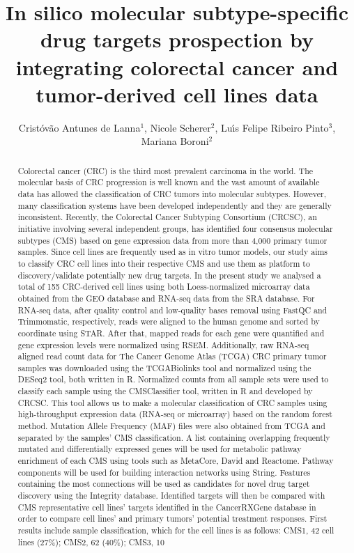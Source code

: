 \documentclass[twoside]{article}
\title{\vspace{-15mm}\fontsize{24pt}{10pt}\selectfont\textbf{In silico molecular subtype-specific drug targets prospection by integrating colorectal cancer and tumor-derived cell lines data}} %
\author{Crist\'ov\~ao Antunes de Lanna$^1$, Nicole Scherer$^2$, Lu\'{\i}s Felipe Ribeiro Pinto$^3$, Mariana Boroni$^2$}
\affil{1 LABORAT\'ORIO DE BIOINFORM\'ATICA E BIOLOGIA COMPUTACIONAL [LBBC/INCA]\\ 2 LABORAT\'ORIO DE BIOINFORM\'ATICA E BIOLOGIA COMPUTACIONAL\\ 3 PROGRAMA DE CARCINOG\^ENESE MOLECULAR\\ }
\date{}
\begin{document}
\maketitle %

\thispagestyle{fancy} %


\begin{abstract}
Colorectal cancer (CRC) is the third most prevalent carcinoma in the world. The molecular basis of CRC progression is well known and the vast amount of available data has allowed the classification of CRC tumors into molecular subtypes. However, many classification systems have been developed independently and they are generally inconsistent. Recently, the Colorectal Cancer Subtyping Consortium (CRCSC), an initiative involving several independent groups, has identified four consensus molecular subtypes (CMS) based on gene expression data from more than 4,000 primary tumor samples. Since cell lines are frequently used as in vitro tumor models, our study aims to classify CRC cell lines into their respective CMS and use them as platform to discovery/validate potentially new drug targets. In the present study we analysed a total of 155 CRC-derived cell lines using both  Loess-normalized microarray data obtained from the GEO database and RNA-seq data from the SRA database. For RNA-seq data, after quality control and low-quality bases removal using FastQC and Trimmomatic, respectively, reads were aligned to the human genome and sorted by coordinate using STAR. After that, mapped reads for each gene were quantified and gene expression levels were normalized using RSEM. Additionally, raw RNA-seq aligned read count data for The Cancer Genome Atlas (TCGA) CRC primary tumor samples was downloaded using the TCGABiolinks tool and normalized using the DESeq2 tool, both written in R. Normalized counts from all sample sets were used to classify each sample using the CMSClassifier tool, written in R and developed by CRCSC. This tool allows us to make a molecular classification of CRC samples using high-throughput expression data (RNA-seq or microarray) based on the random forest method. Mutation Allele Frequency (MAF) files were also obtained from TCGA and separated by the samples' CMS classification. A list containing overlapping frequently mutated and differentially expressed genes will be used for metabolic pathway enrichment of each CMS using tools such as MetaCore, David and Reactome. Pathway components will be used for building interaction networks using String. Features containing the most connections will be used as candidates for novel drug target discovery using the Integrity database. Identified targets will then be compared with CMS representative cell lines' targets identified in the CancerRXGene database in order to compare cell lines' and primary tumors' potential treatment responses. First results include sample classification, which for the cell lines is as follows: CMS1, 42 cell lines (27\%); CMS2, 62 (40\%); CMS3, 10 
\end{abstract}
\end{document}
